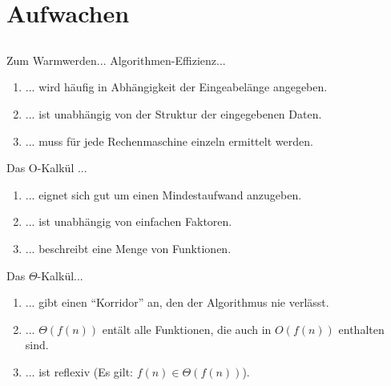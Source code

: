 
\section[Einstieg]{Aufwachen}
\subsection*{}
\begin{frame}{Zum Warmwerden...}
   Algorithmen-Effizienz...
    \begin{enumerate}
    \item { 
    ... wird häufig in Abhängigkeit der Eingeabelänge angegeben.
    }
    \item { 
    ... ist unabhängig von der Struktur der eingegebenen Daten.
    }
    \item { 
    ... muss für jede Rechenmaschine einzeln ermittelt werden.
    }
    \end{enumerate}

  Das O-Kalkül ...
    \begin{enumerate}
    \item { 
    ... eignet sich gut um einen Mindestaufwand anzugeben.
    }
    \item { 
    ... ist unabhängig von einfachen Faktoren.
    }
    \item { 
    ... beschreibt eine Menge von Funktionen.
    }
    \end{enumerate}

  Das $\Theta$-Kalkül...
    \begin{enumerate}
    \item { 
    ... gibt einen "`Korridor"' an, den der Algorithmus nie verlässt.
    }
    \item { 
    ... $\Theta(f(n))$ entält alle Funktionen, die auch in $O(f(n))$ enthalten sind.
    }
    \item { 
    ... ist reflexiv (Es gilt: $f(n) \in \Theta(f(n))$).
    }
    \end{enumerate}
\end{frame}
